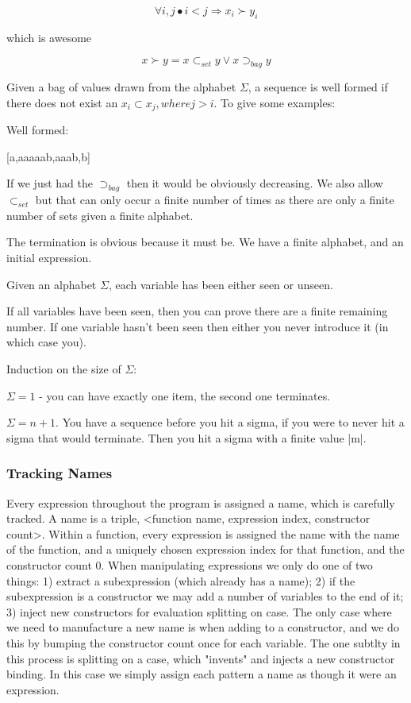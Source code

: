 \documentclass{sigplanconf}
\begin{document}
\[
\forall i, j \bullet i < j \Rightarrow x_i \succ y_i
\]

which is awesome

\[
x \succ y = x \subset_{set} y \vee x \supset_{bag} y
\]

Given a bag of values drawn from the alphabet $\Sigma$, a sequence is well formed if there does not exist an $x_i \subset x_j, where j > i$. To give some examples:

Well formed:

[a,aaaaab,aaab,b]

If we just had the $\supset_{bag}$ then it would be obviously decreasing. We also allow $\subset_{set}$ but that can only occur a finite number of times as there are only a finite number of sets given a finite alphabet.

The termination is obvious because it must be. We have a finite alphabet, and an initial expression.

Given an alphabet $\Sigma$, each variable has been either seen or unseen.

If all variables have been seen, then you can prove there are a finite remaining number. If one variable hasn't been seen then either you never introduce it (in which case you).

Induction on the size of $\Sigma$:

$\Sigma = 1$ - you can have exactly one item, the second one terminates.

$\Sigma = n+1$. You have a sequence before you hit a sigma, if you were to never hit a sigma that would terminate. Then you hit a sigma with a finite value |m|.

\subsubsection{Tracking Names}

Every expression throughout the program is assigned a name, which is carefully tracked. A name is a triple, <function name, expression index, constructor count>. Within a function, every expression is assigned the name with the name of the function, and a uniquely chosen expression index for that function, and the constructor count 0. When manipulating expressions we only do one of two things: 1) extract a subexpression (which already has a name); 2) if the subexpression is a constructor we may add a number of variables to the end of it; 3) inject new constructors for evaluation splitting on case. The only case where we need to manufacture a new name is when adding to a constructor, and we do this by bumping the constructor count once for each variable. The one subtlty in this process is splitting on a case, which "invents" and injects a new constructor binding. In this case we simply assign each pattern a name as though it were an expression.
\end{document}
